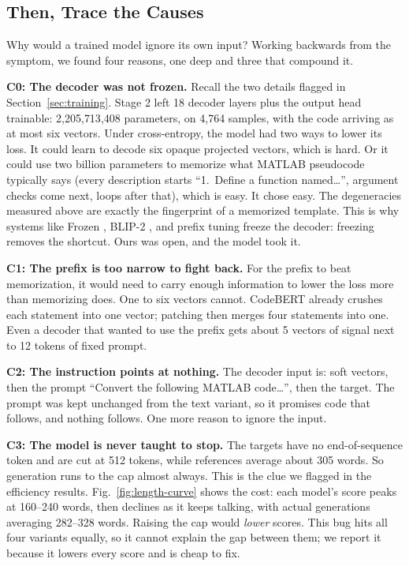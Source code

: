 \documentclass[conference]{IEEEtran}
\newcommand{\NTrain}{4{,}764}
\begin{document}
\subsection{Then, Trace the Causes}
\label{sec:causes}
Why would a trained model ignore its own input? Working backwards from the symptom, we found four reasons, one deep and three that compound it.

\textbf{C0: The decoder was not frozen.} Recall the two details flagged in Section~\ref{sec:training}. Stage 2 left 18 decoder layers plus the output head trainable: 2{,}205{,}713{,}408 parameters, on \NTrain{} samples, with the code arriving as at most six vectors. Under cross-entropy, the model had two ways to lower its loss. It could learn to decode six opaque projected vectors, which is hard. Or it could use two billion parameters to memorize what MATLAB pseudocode typically says (every description starts ``1.\ Define a function named\ldots'', argument checks come next, loops after that), which is easy. It chose easy. The degeneracies measured above are exactly the fingerprint of a memorized template. This is why systems like Frozen \cite{tsimpoukelli2021frozen}, BLIP-2 \cite{li2023blip2}, and prefix tuning \cite{li2021prefix} freeze the decoder: freezing removes the shortcut. Ours was open, and the model took it.

\textbf{C1: The prefix is too narrow to fight back.} For the prefix to beat memorization, it would need to carry enough information to lower the loss more than memorizing does. One to six vectors cannot. CodeBERT already crushes each statement into one vector; patching then merges four statements into one. Even a decoder that wanted to use the prefix gets about 5 vectors of signal next to 12 tokens of fixed prompt.

\textbf{C2: The instruction points at nothing.} The decoder input is: soft vectors, then the prompt ``Convert the following MATLAB code\ldots'', then the target. The prompt was kept unchanged from the text variant, so it promises code that follows, and nothing follows. One more reason to ignore the input.

\textbf{C3: The model is never taught to stop.} The targets have no end-of-sequence token and are cut at 512 tokens, while references average about 305 words. So generation runs to the cap almost always. This is the clue we flagged in the efficiency results. Fig.~\ref{fig:length-curve} shows the cost: each model's score peaks at 160--240 words, then declines as it keeps talking, with actual generations averaging 282--328 words. Raising the cap would \emph{lower} scores. This bug hits all four variants equally, so it cannot explain the gap between them; we report it because it lowers every score and is cheap to fix.
\end{document}
